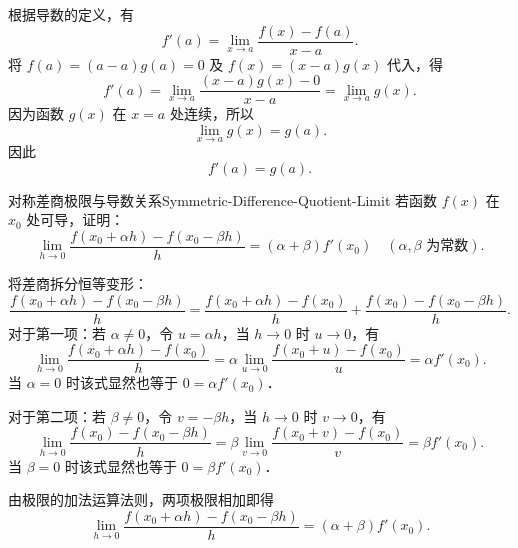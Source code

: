\begin{myproof}
    根据导数的定义，有
    \begin{equation}
        f'(a) = \lim_{x\to a} \frac{f(x) - f(a)}{x - a}.
    \end{equation}
    将 $f(a) = (a - a)g(a) = 0$ 及 $f(x) = (x - a)g(x)$ 代入，得
    \begin{equation}
        f'(a) = \lim_{x\to a} \frac{(x - a)g(x) - 0}{x - a} = \lim_{x\to a} g(x).
    \end{equation}
    因为函数 $g(x)$ 在 $x = a$ 处连续，所以
    \begin{equation}
        \lim_{x\to a} g(x) = g(a).
    \end{equation}
    因此
    \begin{equation}
        f'(a) = g(a).
    \end{equation}
\end{myproof}

\begin{problem}{对称差商极限与导数关系}{Symmetric-Difference-Quotient-Limit}
    若函数 $f(x)$ 在 $x_0$ 处可导，证明：
    \begin{equation}
        \lim_{h\to 0} \frac{f(x_0 + \alpha h) - f(x_0 - \beta h)}{h} = (\alpha + \beta)f'(x_0) \quad (\alpha, \beta \text{ 为常数}).
    \end{equation}
\end{problem}

\begin{myproof}
    将差商拆分恒等变形：
    \begin{equation}
        \frac{f(x_0 + \alpha h) - f(x_0 - \beta h)}{h} = \frac{f(x_0 + \alpha h) - f(x_0)}{h} + \frac{f(x_0) - f(x_0 - \beta h)}{h}.
    \end{equation}
    对于第一项：若 $\alpha \neq 0$，令 $u = \alpha h$，当 $h \to 0$ 时 $u \to 0$，有
    \begin{equation}
        \lim_{h\to 0} \frac{f(x_0 + \alpha h) - f(x_0)}{h} = \alpha \lim_{u\to 0} \frac{f(x_0 + u) - f(x_0)}{u} = \alpha f'(x_0).
    \end{equation}
    当 $\alpha = 0$ 时该式显然也等于 $0 = \alpha f'(x_0)$．

    对于第二项：若 $\beta \neq 0$，令 $v = -\beta h$，当 $h \to 0$ 时 $v \to 0$，有
    \begin{equation}
        \lim_{h\to 0} \frac{f(x_0) - f(x_0 - \beta h)}{h} = \beta \lim_{v\to 0} \frac{f(x_0 + v) - f(x_0)}{v} = \beta f'(x_0).
    \end{equation}
    当 $\beta = 0$ 时该式显然也等于 $0 = \beta f'(x_0)$．

    由极限的加法运算法则，两项极限相加即得
    \begin{equation}
        \lim_{h\to 0} \frac{f(x_0 + \alpha h) - f(x_0 - \beta h)}{h} = (\alpha + \beta)f'(x_0).
    \end{equation}
\end{myproof}

